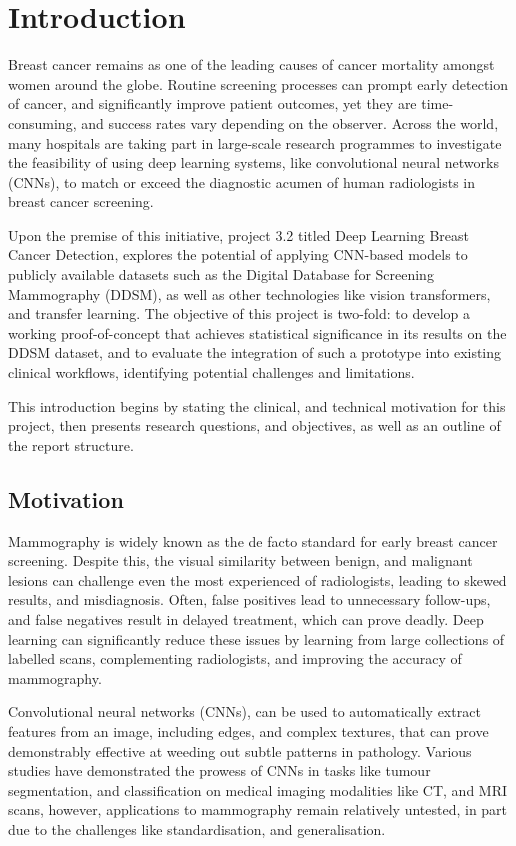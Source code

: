 \documentclass[main]{subfiles}
\begin{document}
\chapter{Introduction}
\label{chap:introduction}
Breast cancer remains as one of the leading causes of cancer mortality amongst women around the globe. Routine screening processes can prompt early detection of cancer, and significantly improve patient outcomes, yet they are time-consuming, and success rates vary depending on the observer. Across the world, many hospitals are taking part in large-scale research programmes to investigate the feasibility of using deep learning systems, like convolutional neural networks (CNNs), to match or exceed the diagnostic acumen of human radiologists in breast cancer screening.

Upon the premise of this initiative, project 3.2 titled \textemdash Deep Learning Breast Cancer Detection, explores the potential of applying CNN-based models to publicly available datasets such as the Digital Database for Screening Mammography (DDSM), as well as other technologies like vision transformers, and transfer learning. The objective of this project is two-fold: to develop a working proof-of-concept that achieves statistical significance in its results on the DDSM dataset, and to evaluate the integration of such a prototype into existing clinical workflows, identifying potential challenges and limitations.

This introduction begins by stating the clinical, and technical motivation for this project, then presents research questions, and objectives, as well as an outline of the report structure.

\section{Motivation}
\label{sec:intro_motivation}
Mammography is widely known as the de facto standard for early breast cancer screening. Despite this, the visual similarity between benign, and malignant lesions can challenge even the most experienced of radiologists, leading to skewed results, and misdiagnosis. Often, false positives lead to unnecessary follow-ups, and false negatives result in delayed treatment, which can prove deadly. Deep learning can significantly reduce these issues by learning from large collections of labelled scans, complementing radiologists, and improving the accuracy of mammography.

Convolutional neural networks (CNNs), can be used to automatically extract features from an image, including edges, and complex textures, that can prove demonstrably effective at weeding out subtle patterns in pathology. Various studies have demonstrated the prowess of CNNs in tasks like tumour segmentation, and classification on medical imaging modalities like CT, and MRI scans, however, applications to mammography remain relatively untested, in part due to the challenges like standardisation, and generalisation.
\end{document}
